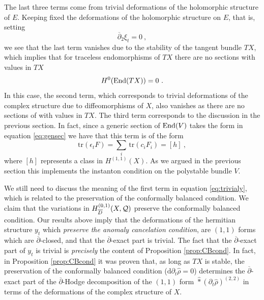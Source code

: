 \documentclass[12pt,a4paper]{article}
\def\bar#1{\overline{#1}}
\let\p=\partial
\def\d{\textrm{d}}
\def\bp{\bar{\partial}}
\def\tr{\textrm{tr}}
\theoremstyle{definition}
\begin{document}
The last three terms come from trivial deformations of the holomorphic structure of $E$.  Keeping fixed the deformations of the holomorphic structure on $E$, that is, setting 
\[\bp_2\xi_t = 0~,\]
we see that the last term vanishes due to the stability of the tangent bundle $TX$, which implies that for traceless endomorphisms of $TX$ there are no sections with values in $TX$
\[ H^0({\rm End} (TX)) = 0~.\]
In this case, the second term, which corresponds to trivial deformations of the complex structure due to diffeomorphisms of $X$, also vanishes as there are no sections of with values in $TX$. 
The third term corresponds to the discussion in the previous section.  In fact, since a generic section of ${\rm End}(V)$ takes the form in equation \eqref{eq:gensec} we have that  this term is of the form
\[ \tr(\epsilon_t F) = \sum_i\,\tr( c_i F_i) = [h]~, \]
where $[h]$ represents a class in $H^{(1,1)}(X)$.  As we argued in the previous section this implements the instanton condition on the polystable bundle $V$.


We still need to discuss the meaning of the  first term  in equation \eqref{eq:trivialy}, which is related to the preservation of the conformally balanced condition.
We claim that  the variations in $H_{\bar D}^{(0,1)}(X, {\cal Q})$ preserve the conformally balanced condition.  Our results above imply that the deformations of the hermitian structure $y_t$ which {\it preserve the anomaly cancelation condition}, are  $(1,1)$ forms which are $\bp$-closed, and that the $\bp$-exact part is trivial.  The fact that the $\bp$-exact part of $y_t$ is trivial is {\it precisely} the content of Proposition \ref{prop:CBcond}.  In fact, in
Proposition \ref{prop:CBcond} it was proven that, as long as $TX$ is stable, the preservation of the conformally balanced condition ($\d\p_t\hat\rho = 0$) determines the $\bp$-exact part of the $\bp$-Hodge decomposition of the $(1,1)$ form $\hat*(\p_t\hat\rho)^{(2,2)}$
in terms of the deformations of the complex structure of $X$.
\end{document}

